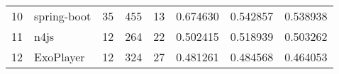 \begin{tabular}{llrrrrrr}
10 &        spring-boot &                         35 &                        455 &                                 13 &                    0.674630 &                 0.542857 &             0.538938 \\
11 &               n4js &                         12 &                        264 &                                 22 &                    0.502415 &                 0.518939 &             0.503262 \\
12 &          ExoPlayer &                         12 &                        324 &                                 27 &                    0.481261 &                 0.484568 &             0.464053 \\
\bottomrule
\end{tabular}

